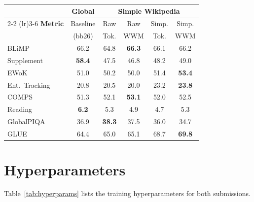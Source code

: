 \documentclass[11pt]{article}
\begin{document}
\begin{center}
\centering
\footnotesize
\setlength{\tabcolsep}{3pt}
\begin{tabular}{lccccc}
\toprule
& \textbf{Global} & \multicolumn{4}{c}{\textbf{Simple Wikipedia}} \\
\cmidrule(lr){2-2} \cmidrule(lr){3-6}
\textbf{Metric} & Baseline & Raw & Raw & Simp. & Simp. \\
& (bb26) & Tok. & WWM & Tok. & WWM \\
\midrule
BLiMP & 66.2 & 64.8 & \textbf{66.3} & 66.1 & 66.2 \\
Supplement & \textbf{58.4} & 47.5 & 46.8 & 48.2 & 49.0 \\
EWoK & 51.0 & 50.2 & 50.0 & 51.4 & \textbf{53.4} \\
Ent.\ Tracking & 20.8 & 20.5 & 20.0 & 23.2 & \textbf{23.8} \\
COMPS & 51.3 & 52.1 & \textbf{53.1} & 52.0 & 52.5 \\
Reading & \textbf{6.2} & 5.3 & 4.9 & 4.7 & 5.3 \\
GlobalPIQA & 36.9 & \textbf{38.3} & 37.5 & 36.0 & 34.7 \\
GLUE & 64.4 & 65.0 & 65.1 & 68.7 & \textbf{69.8} \\
\bottomrule
\end{tabular}
\label{tab:full-results-simplewiki}
\end{center}
\section{Hyperparameters}
\label{app:hyperparams}

Table~\ref{tab:hyperparams} lists the training hyperparameters for both submissions.
\end{document}
